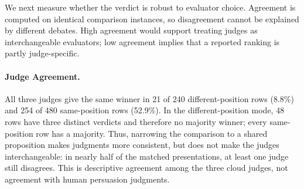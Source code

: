 \documentclass{article}
\begin{document}
We next measure whether the verdict is robust to evaluator choice. Agreement is computed on identical comparison instances, so disagreement cannot be explained by different debates. High agreement would support treating judges as interchangeable evaluators; low agreement implies that a reported ranking is partly judge-specific.

\paragraph{Judge Agreement.}
All three judges give the same winner in 21 of 240 different-position rows (8.8\%) and 254 of 480 same-position rows (52.9\%). In the different-position mode, 48 rows have three distinct verdicts and therefore no majority winner; every same-position row has a majority. Thus, narrowing the comparison to a shared proposition makes judgments more consistent, but does not make the judges interchangeable: in nearly half of the matched presentations, at least one judge still disagrees. This is descriptive agreement among the three cloud judges, not agreement with human persuasion judgments.

\end{document}
